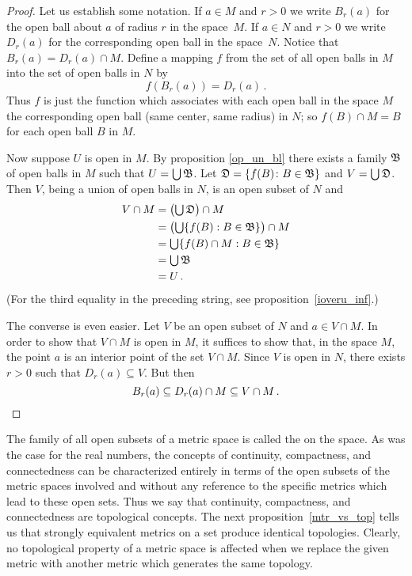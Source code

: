 \begin{proof} Let us establish some notation. If $a \in M$ and $r > 0$ we write $B_r(a)$ for
the open ball about $a$ of radius $r$ in the space~$M$. If $a \in N$ and $r>0$ we write
$D_r(a)$ for the corresponding open ball in the space~$N$.  Notice that $B_r(a) = D_r(a) \cap
M$. Define a mapping $f$ from the set of all open balls in $M$ into the set of open balls in
$N$ by
  \[ f(B_r(a)) = D_r(a)\,. \]
Thus $f$ is just the function which associates with each open ball in the space $M$ the
corresponding open ball (same center, same radius) in $N$; so $f(B) \cap M = B$ for each open
ball $B$ in $M$.

Now suppose $U$ is open in $M$. By proposition \ref{op_un_bl} there exists a family
$\mathfrak{B}$ of open balls in $M$ such that $U = \bigcup\mathfrak{B}$.  Let $\mathfrak{D} = \{f(B)
\colon B \in \mathfrak{B}\}$ and $V = \bigcup\mathfrak{D}$. Then $V$, being a union of open balls
in $N$, is an open subset of $N$ and
 \begin{align*}
   V \cap M
        &= \bigl(\textstyle\bigcup \mathfrak{D}\bigr) \cap M \\
        &= \bigl(\textstyle\bigcup\{f(B):B \in \mathfrak{B}\}\bigr)\cap M\\
        &= \textstyle\bigcup\{f(B) \cap M: B \in \mathfrak{B}\} \\
        &= \textstyle\bigcup \mathfrak{B} \\
        &= U\,.
 \end{align*}
(For the third equality in the preceding string, see proposition~\ref{ioveru_inf}.)

The converse is even easier. Let $V$ be an open subset of $N$ and $a \in V \cap M$. In order
to show that $V \cap M$ is open in $M$, it suffices to show that, in the space $M$, the point
$a$ is an interior point of the set $V \cap M$. Since $V$ is open in $N$, there exists $r>0$
such that $D_r(a) \subseteq V$. But then
  \[ B_r(a) \subseteq D_r(a) \cap M \subseteq V \cap M\,.   \qedhere \]
\end{proof}

The family of all open subsets of a metric space is called the
 on the space. As was the case for the real numbers, the concepts of
continuity, compactness, and connectedness can be characterized entirely in terms of the
open subsets of the metric spaces involved and without any reference to the specific
metrics which lead to these open sets. Thus we say that continuity, compactness, and
connectedness are topological concepts.  The next proposition~\ref{mtr_vs_top} tells us
that strongly equivalent metrics on a set produce identical topologies. Clearly, no
topological property of a metric space is affected when we replace the given metric with
another metric which generates the same topology.

